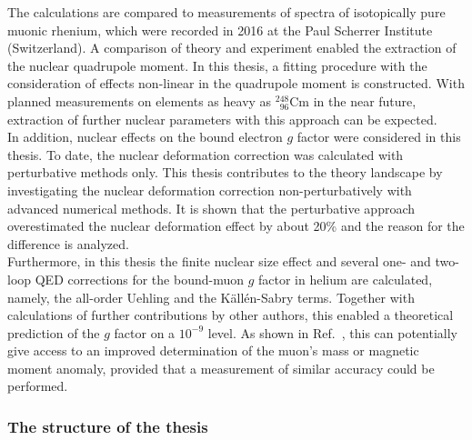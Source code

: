The calculations are compared to measurements of spectra of isotopically pure muonic rhenium, which were recorded in 2016 at the Paul Scherrer Institute (Switzerland). A comparison of theory and experiment enabled the extraction of the nuclear quadrupole moment. In this thesis, a fitting procedure with the consideration of effects non-linear in the quadrupole moment is constructed.
With planned measurements on elements as heavy as $^{248}_{\phantom{1}96}\text{Cm}$ in the near future, extraction of further nuclear parameters with this approach can be expected.\\[11pt]%
In addition, nuclear effects on the bound electron $g$ factor were considered in this thesis. To date, the nuclear deformation correction was calculated with perturbative methods only. This thesis contributes to the theory landscape by investigating the nuclear deformation correction non-perturbatively with advanced numerical methods. It is shown that the perturbative approach overestimated the nuclear deformation effect by about 20\% and the reason for the difference is analyzed.\\[11pt]%
Furthermore, in this thesis the finite nuclear size effect and several one- and two-loop QED corrections for the bound-muon $g$ factor in helium are calculated, namely, the all-order Uehling and the Källén-Sabry terms. Together with calculations of further contributions by other authors, this enabled a theoretical prediction of the $g$ factor on a $10^{-9}$ level. As shown in Ref.~\cite{sikora2018}, this can potentially give access to an improved determination of the muon's mass or magnetic moment anomaly, provided that a measurement of similar accuracy could be performed.


\subsubsection*{The structure of the thesis}

